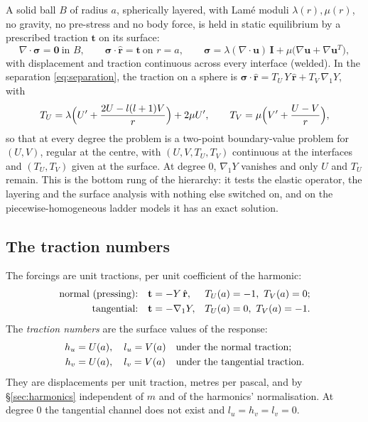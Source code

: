 \documentclass[11pt]{article}
\numberwithin{equation}{section}
\newcommand{\vu}{\mathbf{u}}
\newcommand{\vt}{\mathbf{t}}
\newcommand{\rhat}{\hat{\mathbf{r}}}
\newcommand{\gradone}{\nabla_{1}}
\newcommand{\bsig}{\bm{\sigma}}
\begin{document}
A solid ball $B$ of radius $a$, spherically layered, with Lam\'e moduli
$\lambda(r),\mu(r)$, no gravity, no pre-stress and no body force, is held
in static equilibrium by a prescribed traction $\vt$ on its surface:
\begin{equation}
  \nabla\cdot\bsig = \mathbf{0}\ \text{in } B,\qquad
  \bsig\cdot\rhat = \vt\ \text{on } r=a,\qquad
  \bsig = \lambda(\nabla\cdot\vu)\,\mathbf{I}
        + \mu\bigl(\nabla\vu+\nabla\vu^{T}\bigr),
  \label{eq:e1-problem}
\end{equation}
with displacement and traction continuous across every interface (welded).
In the separation \eqref{eq:separation}, the traction on a sphere is
$\bsig\cdot\rhat = T_U\,Y\,\rhat + T_V\,\gradone Y$, with
\begin{equation}
  T_U = \lambda\Bigl(U' + \frac{2U - l(l+1)V}{r}\Bigr) + 2\mu U',
  \qquad
  T_V = \mu\Bigl(V' + \frac{U-V}{r}\Bigr),
  \label{eq:tractions}
\end{equation}
so that at every degree the problem is a two-point boundary-value problem
for $(U,V)$, regular at the centre, with $(U,V,T_U,T_V)$ continuous at the
interfaces and $(T_U,T_V)$ given at the surface. At degree 0, $\gradone Y$
vanishes and only $U$ and $T_U$ remain. This is the bottom rung of the
hierarchy: it tests the elastic operator, the layering and the surface
analysis with nothing else switched on, and on the piecewise-homogeneous
ladder models it has an exact solution.

\subsection{The traction numbers}
\label{sec:e1-numbers}

The forcings are unit tractions, per unit coefficient of the harmonic:
\begin{align}
  \text{normal (pressing):}&\quad \vt = -Y\,\rhat, &
    T_U(a)&=-1,\ T_V(a)=0; \notag\\
  \text{tangential:}&\quad \vt = -\gradone Y, &
    T_U(a)&=0,\ T_V(a)=-1.
\end{align}
The \emph{traction numbers} are the surface values of the response:
\begin{align}
  h_u &= U(a),\quad l_u = V(a) && \text{under the normal traction}; \notag\\
  h_v &= U(a),\quad l_v = V(a) && \text{under the tangential traction}.
\end{align}
They are displacements per unit traction, metres per pascal, and by
\S\ref{sec:harmonics} independent of $m$ and of the harmonics'
normalisation. At degree 0 the tangential channel does not exist and
$l_u=h_v=l_v=0$.
\end{document}
